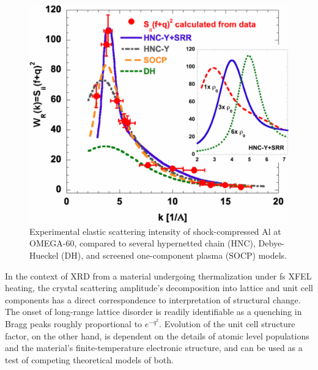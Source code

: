 \documentclass [11pt, proquest, article] {uwthesis}[2016/11/22]
\begin{document}
\begin{figure}[h] 
\caption{Experimental elastic scattering intensity of shock-compressed Al at OMEGA-60, compared to several hypernetted chain (HNC), Debye-Hueckel (DH), and screened one-component plasma (SOCP) models. \cite{ma2013x}}
\label{fig:ma}
\centering
\includegraphics[scale=0.5]{../Figures/ma_Al.png}
\end{figure}

In the context of XRD from a material undergoing thermalization under fs XFEL heating, the crystal scattering amplitude's decomposition into lattice and unit cell components has a direct correspondence to interpretation of structural change. The onset of long-range lattice disorder is readily identifiable as a quenching in Bragg peaks roughly proportional to $e^{-q^2}$. Evolution of the unit cell structure factor, on the other hand, is dependent on the details of atomic level populations and the material's finite-temperature electronic structure, and can be used as a test of competing theoretical models of both. 

\end{document}

